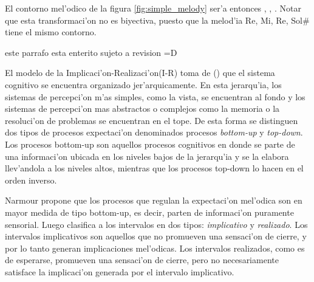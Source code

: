 \begin{imagen}
    \width{11cm}
\end{imagen}

El contorno mel'odico de la figura \ref{fig:simple_melody} ser'a entonces , , .
Notar que esta transformaci'on no es biyectiva, puesto que la melod'ia Re, Mi, Re, Sol\# tiene el mismo contorno.

\alert{este parrafo esta enterito sujeto a revision =D}

El modelo de la Implicaci'on-Realizaci'on(I-R) toma de (\cita) que el sistema cognitivo se encuentra organizado jer'arquicamente. En esta jerarqu'ia, los sistemas 
de percepci'on m'as simples, como la vista, se encuentran al fondo y los sistemas de percepci'on mas abstractos o complejos como la memoria o la 
resoluci'on de problemas se encuentran en el tope. De esta forma se distinguen dos tipos de procesos expectaci'on denominados procesos \emph{bottom-up} 
y \emph{top-down}. Los procesos bottom-up son aquellos procesos cognitivos en donde se parte de una informaci'on ubicada en los niveles bajos de la jerarqu'ia y se la 
elabora llev'andola a los niveles altos, mientras que los procesos top-down lo hacen en el orden inverso. 

Narmour propone que los procesos que regulan la expectaci'on mel'odica son en mayor medida de tipo bottom-up, es decir, parten de informaci'on puramente sensorial. 
Luego clasifica a los intervalos en dos tipos: \emph{implicativo} y \emph{realizado}. Los intervalos implicativos son aquellos que no promueven una sensaci'on de cierre, 
y por lo tanto generan implicaciones mel'odicas. Los intervalos realizados, como es de esperarse, promueven una sensaci'on de cierre, pero no necesariamente satisface
la implicaci'on generada por el intervalo implicativo. 
 

